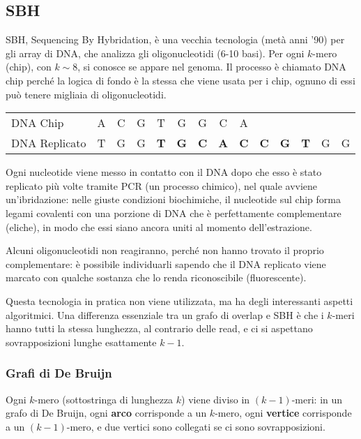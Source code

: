 \subsection{SBH}
SBH, Sequencing By Hybridation, è una vecchia tecnologia (metà anni '90) per gli array di DNA, che analizza gli oligonucleotidi (6-10 basi). Per ogni $k$-mero (chip), con $k \sim 8$, si conosce se appare nel genoma. Il processo è chiamato DNA chip perché la logica di fondo è la stessa che viene usata per i chip, ognuno di essi può tenere migliaia di oligonucleotidi.

\begin{example}{}{}
	\begin{tabular}{l | *{13}{c}}
		DNA Chip		& A & C & G & T & G & G & C & A \\
		DNA Replicato	& T & G & G & \textbf{T} & \textbf{G} & \textbf{C} & \textbf{A} & \textbf{C} & \textbf{C} & \textbf{G} & \textbf{T} & G & G
	\end{tabular}
\end{example}

Ogni nucleotide viene messo in contatto con il DNA dopo che esso è stato replicato più volte tramite PCR (un processo chimico), nel quale avviene un'ibridazione: nelle giuste condizioni biochimiche, il nucleotide sul chip forma legami covalenti con una porzione di DNA che è perfettamente complementare (eliche), in modo che essi siano ancora uniti al momento dell'estrazione. 

Alcuni oligonucleotidi non reagiranno, perché non hanno trovato il proprio complementare: è possibile individuarli sapendo che il DNA replicato viene marcato con qualche sostanza che lo renda riconoscibile (fluorescente). 

Questa tecnologia in pratica non viene utilizzata, ma ha degli interessanti aspetti algoritmici. Una differenza essenziale tra un grafo di overlap e SBH è che i $k$-meri hanno tutti la stessa lunghezza, al contrario delle read, e ci si aspettano sovrapposizioni lunghe esattamente $k - 1$.

\subsubsection{Grafi di De Bruijn}
Ogni $k$-mero (sottostringa di lunghezza $k$) viene diviso in $(k - 1)$-meri: in un grafo di De Bruijn, ogni \textbf{arco} corrisponde a un $k$-mero, ogni \textbf{vertice} corrisponde a un $(k - 1)$-mero, e due vertici sono collegati se ci sono sovrapposizioni. 

